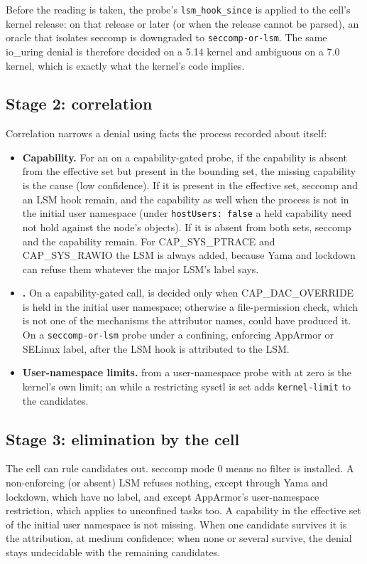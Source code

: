 Before the reading is taken, the probe's \texttt{lsm\_hook\_since} is applied to the cell's kernel release: on that release or later (or when the release cannot be parsed), an oracle that isolates seccomp is downgraded to \texttt{seccomp-or-lsm}. The same io\_uring denial is therefore decided on a 5.14 kernel and ambiguous on a 7.0 kernel, which is exactly what the kernel's code implies.

\subsection{Stage 2: correlation}
Correlation narrows a denial using facts the process recorded about itself:
\begin{itemize}[leftmargin=*]
\item \textbf{Capability.} For an  on a capability-gated probe, if the capability is absent from the effective set but present in the bounding set, the missing capability is the cause (low confidence). If it is present in the effective set, seccomp and an LSM hook remain, and the capability as well when the process is not in the initial user namespace (under \texttt{hostUsers: false} a held capability need not hold against the node's objects). If it is absent from both sets, seccomp and the capability remain. For CAP\_SYS\_PTRACE and CAP\_SYS\_RAWIO the LSM is always added, because Yama and lockdown can refuse them whatever the major LSM's label says.
\item \textbf{.} On a capability-gated call,  is decided only when CAP\_DAC\_OVERRIDE is held in the initial user namespace; otherwise a file-permission check, which is not one of the mechanisms the attributor names, could have produced it. On a \texttt{seccomp-or-lsm} probe under a confining, enforcing AppArmor or SELinux label,  after the LSM hook is attributed to the LSM.
\item \textbf{User-namespace limits.}  from a user-namespace probe with  at zero is the kernel's own limit; an  while a restricting sysctl is set adds \texttt{kernel-limit} to the candidates.
\end{itemize}

\subsection{Stage 3: elimination by the cell}
The cell can rule candidates out. seccomp mode 0 means no filter is installed. A non-enforcing (or absent) LSM refuses nothing, except through Yama and lockdown, which have no label, and except AppArmor's user-namespace restriction, which applies to unconfined tasks too. A capability in the effective set of the initial user namespace is not missing. When one candidate survives it is the attribution, at medium confidence; when none or several survive, the denial stays undecidable with the remaining candidates.

